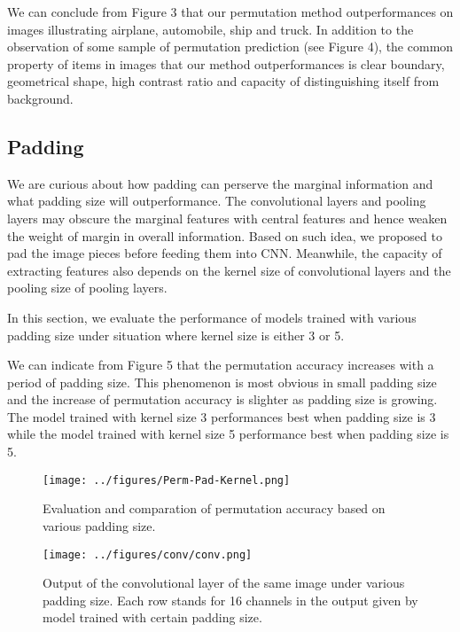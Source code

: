 \documentclass[twocolumn]{article}
\begin{document}
We can conclude from Figure 3 that our permutation method outperformances on images illustrating airplane, 
automobile, ship and truck. In addition to the observation of some sample of permutation prediction (see 
Figure 4), the common property of items in images that our method outperformances is clear boundary, 
geometrical shape, high contrast ratio and capacity of distinguishing itself from background. 
\subsection{Padding}
We are curious about how padding can perserve the marginal information and what padding size will 
outperformance. The convolutional layers and pooling layers may obscure the marginal features with central 
features and hence weaken the weight of margin in overall information. Based on such idea, we proposed to 
pad the image pieces before feeding them into CNN. Meanwhile, the capacity of extracting features also 
depends on the kernel size of convolutional layers and the pooling size of pooling layers. 

In this section, we evaluate the performance of models trained with various padding size under situation 
where kernel size is either 3 or 5. 

We can indicate from Figure 5 that the permutation accuracy increases with a period of padding size. 
This phenomenon is most obvious in small padding size and the increase of permutation accuracy is slighter 
as padding size is growing. The model trained with kernel size 3 performances best when padding size is 3 
while the model trained with kernel size 5 performance best when padding size is 5. 
\begin{figure}[h]
    \centering
    \texttt{[image: ../figures/Perm-Pad-Kernel.png]}
    \caption{Evaluation and comparation of permutation accuracy based on various padding size.}
\end{figure}
\begin{figure}[h]
    \centering
    \texttt{[image: ../figures/conv/conv.png]}
    \caption{Output of the convolutional layer of the same image under various padding size. Each row stands 
    for 16 channels in the output given by model trained with certain padding size. }
\end{figure}
\end{document}
